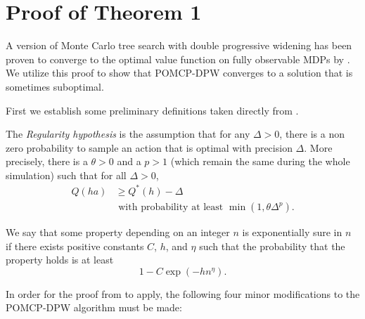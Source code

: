 \chapter{Proof of Theorem 1} \label{sec:proof}

A version of Monte Carlo tree search with double progressive widening has been proven to converge to the optimal value function on fully observable MDPs by \citet{auger2013continuous}.
We utilize this proof to show that POMCP-DPW converges to a solution that is sometimes suboptimal.

First we establish some preliminary definitions taken directly from \citet{auger2013continuous}.

\begin{definition}
    The \emph{Regularity hypothesis} is the assumption that for any $\Delta > 0$, there is a non zero probability to sample an action that is optimal with precision $\Delta$. More precisely, there is a $\theta > 0$ and a $p > 1$ (which remain the same during the whole simulation) such that for all $\Delta > 0$, 
\begin{align}
    Q(ha) & \geq Q^*(h)-\Delta \nonumber{}\\ & \text{ with probability at least } \min(1, \theta \Delta^p)\text{.}
\end{align}
\end{definition}

\begin{definition}
    We say that some property depending on an integer $n$ is exponentially sure in $n$ if there exists positive constants $C$, $h$, and $\eta$ such that the probability that the property holds is at least $$1-C \exp(-hn^\eta)\text{.}$$
\end{definition}

In order for the proof from \citet{auger2013continuous} to apply, the following four minor modifications to the POMCP-DPW algorithm must be made: 


